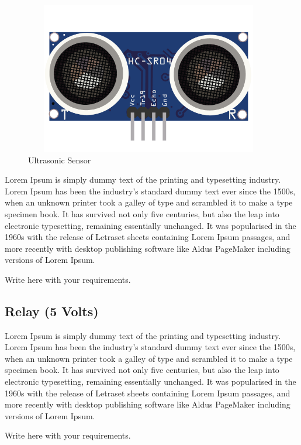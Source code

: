         \vspace{1\baselineskip}

	
	\begin{figure}[H]
	\centering
	\includegraphics[width=10.89cm,height=6.64cm]{./images/image4.png}
	\caption{Ultrasonic Sensor}
	\label{fig:ultrasonic_sensor}
	\end{figure}
	
	
	
	\vspace{5\baselineskip}
	Lorem Ipsum is simply dummy text of the printing and typesetting industry. Lorem Ipsum has been the industry's standard dummy text ever since the 1500s, when an unknown printer took a galley of type and scrambled it to make a type specimen book. It has survived not only five centuries, but also the leap into electronic typesetting, remaining essentially unchanged. It was popularised in the 1960s with the release of Letraset sheets containing Lorem Ipsum passages, and more recently with desktop publishing software like Aldus PageMaker including versions of Lorem Ipsum.
	\vspace{3\baselineskip}
    \begin{center}
        \Large Write here with your requirements.
    \end{center}
	\vspace{3\baselineskip}

	
		\subsection{Relay (5 Volts)} Lorem Ipsum is simply dummy text of the printing and typesetting industry. Lorem Ipsum has been the industry's standard dummy text ever since the 1500s, when an unknown printer took a galley of type and scrambled it to make a type specimen book. It has survived not only five centuries, but also the leap into electronic typesetting, remaining essentially unchanged. It was popularised in the 1960s with the release of Letraset sheets containing Lorem Ipsum passages, and more recently with desktop publishing software like Aldus PageMaker including versions of Lorem Ipsum.
	\vspace{3\baselineskip}
    \begin{center}
        \Large Write here with your requirements.
    \end{center}
	\vspace{3\baselineskip}
	
